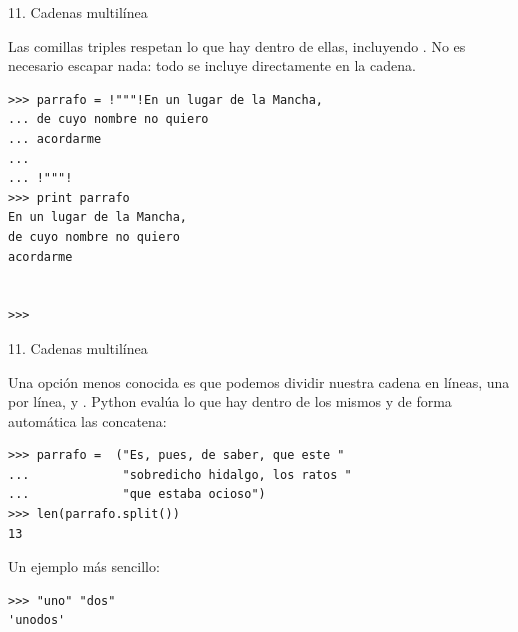 \documentclass[14pt]{beamer}
\begin{document}
\begin{frame}[fragile]{11. Cadenas multilínea}

  \begin{block}{}
    \centering
    Las comillas triples respetan  lo que hay dentro
    de ellas, incluyendo . No es necesario
    escapar nada: todo se incluye directamente en la cadena.
  \end{block}

  \begin{exampleblock}{}
    \scriptsize
    \begin{lstlisting}[escapechar=!]
>>> parrafo = !"""!En un lugar de la Mancha,
... de cuyo nombre no quiero
... acordarme
...
... !"""!
>>> print parrafo
En un lugar de la Mancha,
de cuyo nombre no quiero
acordarme


>>>
    \end{lstlisting}
  \end{exampleblock}
\end{frame}

\begin{frame}[fragile]{11. Cadenas multilínea}

  \begin{alertblock}{}
    \small
    \centering
    Una opción menos conocida es que podemos dividir nuestra cadena en
    líneas, una por línea, y .
    Python evalúa lo que hay dentro de los mismos y de forma
    automática las concatena:
   \end{alertblock}

  \begin{exampleblock}{}
    \scriptsize
    \begin{lstlisting}
>>> parrafo =  ("Es, pues, de saber, que este "
...             "sobredicho hidalgo, los ratos "
...             "que estaba ocioso")
>>> len(parrafo.split())
13
    \end{lstlisting}
  \end{exampleblock}

  \small
  \begin{exampleblock}
    {Un ejemplo más sencillo:}
    \begin{lstlisting}
>>> "uno" "dos"
'unodos'
    \end{lstlisting}
  \end{exampleblock}
\end{frame}
\end{document}
